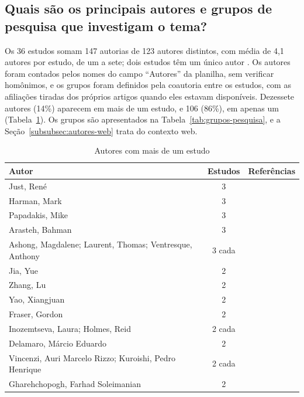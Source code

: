 \subsection{Quais são os principais autores e grupos de pesquisa que investigam o tema?}
\label{subsec:autores-grupos}

Os 36 estudos somam 147 autorias de 123 autores distintos, com média de 4,1 autores por estudo, de um a sete; dois estudos têm um único autor \cite{nica2011, grano2019}. Os autores foram contados pelos nomes do campo ``Autores'' da planilha, sem verificar homônimos, e os grupos foram definidos pela coautoria entre os estudos, com as afiliações tiradas dos próprios artigos quando eles estavam disponíveis. Dezessete autores (14\%) aparecem em mais de um estudo, e 106 (86\%), em apenas um (Tabela~\ref{tab:autores-frequentes}). Os grupos são apresentados na Tabela~\ref{tab:grupos-pesquisa}, e a Seção~\ref{subsubsec:autores-web} trata do contexto web.

\begin{table}[H]
    \centering
    \scriptsize
    \caption{Autores com mais de um estudo}
    \label{tab:autores-frequentes}
    \begin{tabular}{|p{3.2cm}|c|p{7.5cm}|}
        \hline
        \textbf{Autor} & \textbf{Estudos} & \textbf{Referências} \\
        \hline
        Just, René & 3 & \cite{just2012, just2014, petrovic2021} \\
        \hline
        Harman, Mark & 3 & \cite{yao2014, zhang2019, ojdanic2023} \\
        \hline
        Papadakis, Mike & 3 & \cite{kintis2010, ojdanic2023, khanfir2023} \\
        \hline
        Arasteh, Bahman & 3 & \cite{shomali2020, arasteh2022, arasteh2023} \\
        \hline
        Ashong, Magdalene; Laurent, Thomas; Ventresque, Anthony & 3 cada & \cite{ashong2025a, ashong2025b, ashong2026} \\
        \hline
        Jia, Yue & 2 & \cite{yao2014, zhang2019} \\
        \hline
        Zhang, Lu & 2 & \cite{zhang2010, zhang2019} \\
        \hline
        Yao, Xiangjuan & 2 & \cite{yao2014, tao2025} \\
        \hline
        Fraser, Gordon & 2 & \cite{just2014, petrovic2021} \\
        \hline
        Inozemtseva, Laura; Holmes, Reid & 2 cada & \cite{inozemtseva2013, just2014} \\
        \hline
        Delamaro, Márcio Eduardo & 2 & \cite{kurtz2016, kuroishi2020} \\
        \hline
        Vincenzi, Auri Marcelo Rizzo; Kuroishi, Pedro Henrique & 2 cada & \cite{kuroishi2020, guerino2024} \\
        \hline
        Gharehchopogh, Farhad Soleimanian & 2 & \cite{arasteh2022, arasteh2023} \\
        \hline
    \end{tabular}
\end{table}

